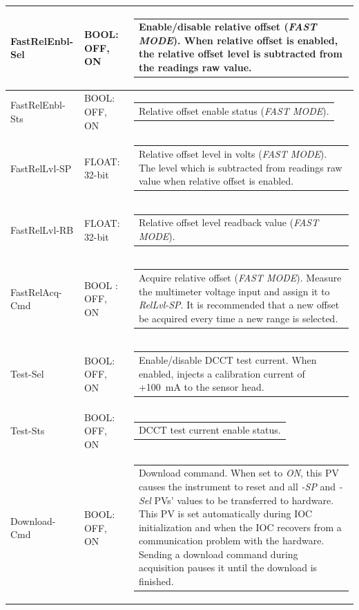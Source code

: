 \documentclass[openany]{article}
\begin{document}
\begin{longtable}{| m{3.0cm} m{4.5cm} m{7.0cm} |}
		FastRelEnbl-Sel & BOOL: OFF, ON & \begin{tabular}{@{}m{6cm}@{}}
	    					Enable/disable relative offset (\emph{FAST MODE}). When relative offset is enabled, the relative offset level is subtracted from the readings raw value.
						\end{tabular} \\ \hline
		FastRelEnbl-Sts & BOOL: OFF, ON & \begin{tabular}{@{}m{6cm}@{}}
	    					Relative offset enable status (\emph{FAST MODE}).
						\end{tabular} \\ \hline
		FastRelLvl-SP & FLOAT: 32-bit & \begin{tabular}{@{}m{6cm}@{}}
	    					Relative offset level in volts (\emph{FAST MODE}). The level which is subtracted from readings raw value when relative offset is enabled.
						\end{tabular} \\ \hline
		FastRelLvl-RB & FLOAT: 32-bit & \begin{tabular}{@{}m{6cm}@{}}
	    					Relative offset level readback value (\emph{FAST MODE}).
						\end{tabular} \\ \hline
		FastRelAcq-Cmd & BOOL : OFF, ON & \begin{tabular}{@{}m{6cm}@{}}
						Acquire relative offset (\emph{FAST MODE}). Measure the multimeter voltage input and assign it to \emph{RelLvl-SP}. It is recommended that a new offset be acquired every time a new range is selected.
						\end{tabular} \\ \hline
		Test-Sel & BOOL: OFF, ON & \begin{tabular}{@{}m{6cm}@{}}
	    					Enable/disable DCCT test current. When enabled, injects a calibration current of +\SI{100}{\milli\ampere} to the sensor head.
						\end{tabular} \\ \hline
		Test-Sts & BOOL: OFF, ON & \begin{tabular}{@{}m{6cm}@{}}
 						DCCT test current enable status.
						\end{tabular} \\ \hline
		Download-Cmd & BOOL: OFF, ON & \begin{tabular}{@{}m{6cm}@{}}
 						Download command. When set to \emph{ON}, this PV causes the instrument to reset and all \emph{-SP} and \emph{-Sel} PVs' values to be transferred to hardware. This PV is set automatically during IOC initialization and when the IOC recovers from a communication problem with the hardware. Sending a download command during acquisition pauses it until the download is finished.
						\end{tabular} \\ \hline
	\end{longtable}
\end{document}
